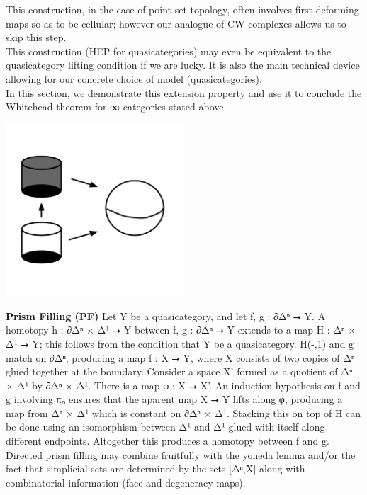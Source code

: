 \documentclass{book}
\theoremstyle{definition}
\begin{document}
This construction, in the case of point set topology, often involves first deforming maps so as to be cellular; however our analogue of CW complexes allows us to skip this step.\\

This construction (HEP for quasicategories) may even be equivalent to the quasicategory lifting condition if we are lucky. It is also the main technical device allowing for our concrete choice of model (quasicategories).\\

In this section, we demonstrate this extension property and use it to conclude the Whitehead theorem for ∞-categories stated above.\\

\begin{center}
\includegraphics[width=0.5\textwidth]{HEP.png}
\end{center}

{\bf Prism Filling (PF)} Let Y be a quasicategory, and let f, g : ∂Δⁿ ⭢ Y. A homotopy h : ∂Δⁿ × Δ¹ ⭢ Y between f, g : ∂Δⁿ ⭢ Y extends to a map H : Δⁿ × Δ¹ ⭢ Y; this follows from the condition that Y be a quasicategory. H(-,1) and g match on ∂Δⁿ, producing a map f : X ⭢ Y, where X consists of two copies of Δⁿ glued together at the boundary. Consider a space X' formed as a quotient of Δⁿ × Δ¹ by ∂Δⁿ × Δ¹. There is a map φ : X ⭢ X'. An induction hypothesis on f and g involving πₙ ensures that the aparent map X ⭢ Y lifts along φ, producing a map from Δⁿ × Δ¹ which is constant on ∂Δⁿ × Δ¹. Stacking this on top of H can be done using an isomorphism between Δ¹ and Δ¹ glued with itself along different endpoints. Altogether this produces a homotopy between f and g.\\

Directed prism filling may combine fruitfully with the yoneda lemma and/or the fact that simplicial sets are determined by the sets [Δⁿ,X] along with combinatorial information (face and degeneracy maps).
\end{document}
